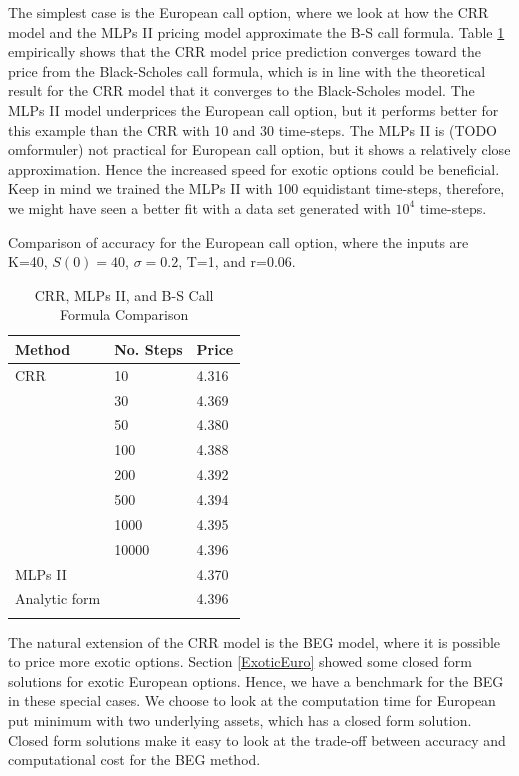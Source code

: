 The simplest case is the European call option, where we look at how the CRR model and the MLPs II pricing model approximate the B-S call formula. Table \ref{tab:EuroCall} empirically shows that the CRR model price prediction converges toward the price from the Black-Scholes call formula, which is in line with the theoretical result for the CRR model that it converges to the Black-Scholes model. The MLPs II model underprices the European call option, but it performs better for this example than the CRR with 10 and 30 time-steps. The MLPs II is (TODO omformuler) not practical for European call option, but it shows a relatively close approximation. Hence the increased speed for exotic options could be beneficial. Keep in mind we trained the MLPs II with 100 equidistant time-steps, therefore, we might have seen a better fit with a data set generated with $10^4$ time-steps.\\

\begin{table}[th]
\caption{CRR, MLPs II, and B-S Call Formula Comparison}{Comparison of accuracy for the European call option, where the inputs are K=40, $S(0)=40$, $\sigma=0.2$, T=1, and r=0.06.}\\
\label{tab:EuroCall}
\centering
\begin{tabular}{l l l}
\toprule
\textbf{Method} & \textbf{No. Steps} & \textbf{Price} \\
\midrule
CRR & 10 & 4.316\\
& 30 & 4.369\\
& 50 & 	4.380\\
& 100 & 4.388\\
& 200 & 4.392\\
& 500 & 4.394\\
& 1000 & 4.395\\
& 10000 & 4.396\\
MLPs II & & 4.370\\
Analytic form & & 4.396\\
\bottomrule\\
\end{tabular}
\end{table}

The natural extension of the CRR model is the BEG model, where it is possible to price more exotic options. Section \ref{ExoticEuro} showed some closed form solutions for exotic European options. Hence, we have a benchmark for the BEG in these special cases. We choose to look at the computation time for European put minimum with two underlying assets, which has a closed form solution. Closed form solutions make it easy to look at the trade-off between accuracy and computational cost for the BEG method. \\

